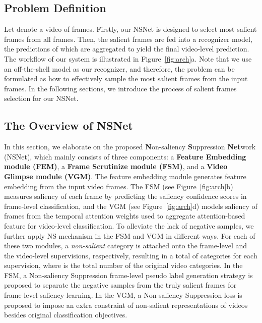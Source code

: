 \documentclass[runningheads]{llncs}
\newcommand{\figref}[1]{Figure~\ref{#1}}
\begin{document}
\subsection{Problem Definition}\label{subsec:Problem Formulation}
Let  denote a video of  frames. Firstly, our NSNet is designed to select  most salient frames from all  frames. Then, the  salient frames are fed into a recognizer model, the predictions of which are aggregated to yield the final video-level prediction. The workflow of our system is illustrated in  \figref{fig:arch}a. Note that we use an off-the-shell model as our recognizer, and therefore, the problem can be formulated as how to effectively sample the most salient frames from the input frames. In the following sections, we introduce the process of salient frames selection for our NSNet.
\subsection{The Overview of NSNet}
In this section, we elaborate on the proposed \textbf{N}on-saliency \textbf{S}uppression \textbf{Net}work (NSNet), which mainly consists of three components: a \textbf{Feature Embedding module (FEM)}, a \textbf{Frame Scrutinize module (FSM)}, and a \textbf{Video Glimpse module (VGM)}. The feature embedding module generates feature embedding from the input video frames. The FSM (see \figref{fig:arch}b) measures saliency of each frame by predicting the saliency confidence scores in frame-level classification, and the VGM (see \figref{fig:arch}d) models saliency of frames from the temporal attention weights used to aggregate attention-based feature for video-level classification. To alleviate the lack of negative samples, we further apply NS mechanism in the FSM and VGM in different ways. For each of these two modules, a \emph{non-salient} category is attached onto the frame-level and the video-level supervisions, respectively, resulting in a total of  categories for each supervision, where  is the total number of the original video categories. In the FSM, a Non-saliency Suppression frame-level pseudo label generation strategy is proposed to separate the negative samples from the truly salient frames for frame-level saliency learning. In the VGM, a Non-saliency Suppression loss is proposed to impose an extra constraint of non-salient representations of videos besides original classification objectives.
\end{document}
